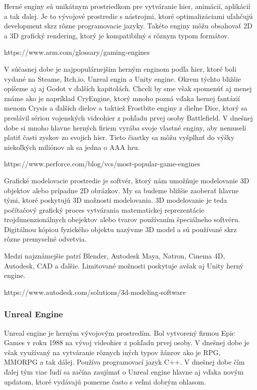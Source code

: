 Herné enginy sú unikátnym prostriedkom pre vytváranie hier, animácií, aplikácií a tak ďalej. Je to vývojové prostredie s nástrojmi, ktoré optimalizáciami uľahčujú development skrz rôzne programovacie jazyky. Takéto enginy môžu obsahovať 2D a 3D grafický rendering, ktorý je kompatibilný s rôznym typom formátov. 

https://www.arm.com/glossary/gaming-engines

V súčasnej dobe je najpopulárnejšim herným enginom podľa hier, ktoré boli vydané na Steame, Itch.io, Unreal engin a Unity engine. Okrem týchto bližšie opíšeme aj aj Godot v ďalších kapitolách. Chceli by sme však spomenúť aj menej známe ako je napríklad CryEngine, ktorý mnoho pozná vďaka hernej fantázií menom Crysis a ďalších dielov a taktiež Frostbite enginy z dieľne Dice, ktorý sa preslávil sériou vojenských videohier z pohľadu prvej osoby Battlefield. V dnešnej dobe si mnoho hlavne herných firiem vyrába svoje vlastné enginy, aby nemuseli platiť časti zyskov zo svojich hier. Tieto čiastky sa môžu vyšplhať do výšky niekoľkých miliónov ak sa jedna o AAA hru. 

https://www.perforce.com/blog/vcs/most-popular-game-engines

Grafické modelovacie prostredie je softvér, ktorý nám umožňuje modelovanie 3D objektov alebo prípadne 2D obrázkov. My sa budeme bližšie zaoberať hlavne tými, ktoré poskytujú 3D možnosti modelovania. 3D modelovanie je teda počítačový grafický proces vytvárania matematickej reprezentácie trojdimenzionálnych obejektov alebo tvarov používaním špeciálneho softvéru. Digitálnou kópiou fyzického objektu nazývme 3D model a sú používané skrz rôzne premyselné odvetvia. 

Medzi najznámejšie patrí Blender, Autodesk Maya, Natron, Cinema 4D, Autodesk, CAD a ďalšie. Limitované možnosti poskytuje avšak aj Unity herný engine. 

https://www.autodesk.com/solutions/3d-modeling-software

\subsubsection{Unreal Engine}

Unreal engine je herným vývojovým prostredím. Bol vytvorený firmou Epic Games v roku 1988 na vývoj videohier z pohľadu prvej osoby. V dnešnej dobe je však využívaný na vytváranie rôznych iných typov žánrov ako je RPG, MMORPG a tak dálej. Používa programovací jazyk C++. V dnešnej dobe čím ďalej tým viac ľudí sa začína zaujímať o Unreal engine hlavne aj vďaka novým updatom, ktoré vydávajú pomerne často s veľmi dobrým ohlasom. 


